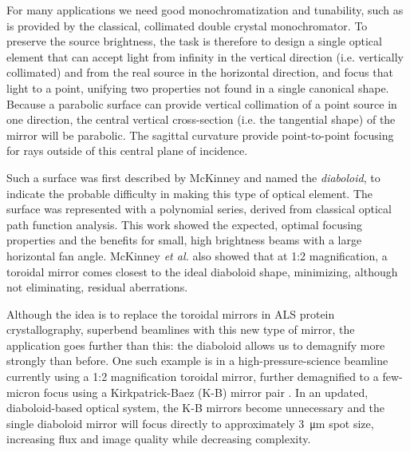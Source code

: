 \documentclass[preprint]{iucr}       %
\begin{document}
For many applications we need good monochromatization and tunability, such as is provided by the classical, collimated double crystal monochromator. To preserve the source brightness, the task is therefore to design a single optical element that can accept light from infinity in the vertical direction (i.e. vertically collimated) and from the real source in the horizontal direction, and focus that light to a point, unifying two properties not found in a single canonical shape.
Because a parabolic surface can provide vertical collimation of a point source in one direction, the central vertical cross-section (i.e. the tangential shape) of the mirror will be parabolic. The sagittal curvature provide point-to-point focusing for rays outside of this central plane of incidence.

Such a surface was first described by McKinney \cite{McKinneySPIE2009} and named the \emph{diaboloid}, to indicate the probable difficulty in making this type of optical element. The surface was represented with a polynomial series, derived from classical optical path function analysis. This work showed the expected, optimal focusing properties and the benefits for small, high brightness beams with a large horizontal fan angle. McKinney {\it et al.} also showed that at 1:2 magnification, a toroidal mirror comes closest to the ideal diaboloid shape, minimizing, although not eliminating, residual aberrations.

Although the idea is to replace the toroidal mirrors in ALS protein crystallography, superbend beamlines with this new type of mirror, the application goes further than this: the diaboloid allows us to demagnify more strongly than before. One such example is in a high-pressure-science beamline currently using a 1:2 magnification toroidal mirror, further demagnified to a few-micron focus using a Kirkpatrick-Baez (K-B) mirror pair \cite{Kirkpatrick1946}. In an updated, diaboloid-based optical system, the K-B mirrors become unnecessary and the single diaboloid mirror will focus directly to approximately \SI{3}{\micro\meter} spot size, increasing flux and image quality while decreasing complexity.
\end{document}
